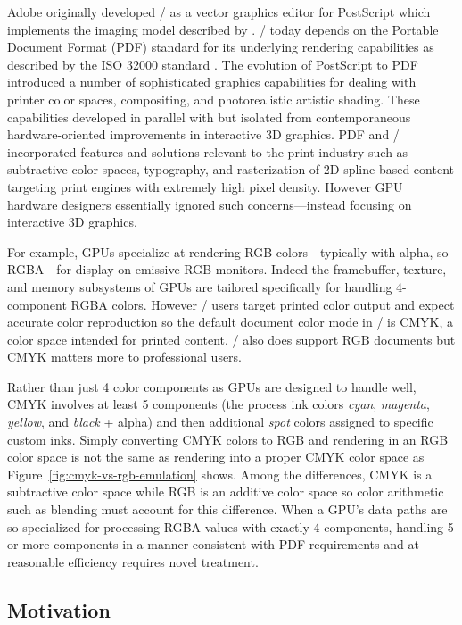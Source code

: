 Adobe
originally developed \Illustrator/ as a vector graphics editor for PostScript \cite{PLRM} which implements the
imaging model described by \cite{Warnock:1982:DIG:800064.801297}.
\Illustrator/ today depends on the Portable Document Format (PDF) standard for its underlying rendering capabilities
as described by the ISO 32000 standard \cite{PDF-Spec}.  The evolution of PostScript to PDF introduced a number
of sophisticated graphics capabilities for dealing with printer color spaces, compositing, and photorealistic artistic shading.
These capabilities developed in parallel with but isolated from
contemporaneous hardware-oriented improvements in interactive 3D graphics.
PDF and \Illustrator/ incorporated features and solutions relevant to
the print industry such as subtractive color spaces, typography, and
rasterization of 2D spline-based content targeting print engines with
extremely high pixel density.  However GPU hardware designers essentially
ignored such concerns---instead focusing on interactive 3D graphics.

For example, GPUs specialize at rendering RGB colors---typically with alpha, so RGBA---for
display on emissive RGB monitors.  Indeed the framebuffer, texture, and memory subsystems of GPUs are 
tailored specifically for handling 4-component RGBA colors.
However \Illustrator/ users target printed color output and expect accurate color reproduction
so the default document color mode in \Illustrator/ is CMYK, a color space intended for printed content.
\Illustrator/ also does support RGB documents but CMYK matters more to professional users.

Rather than just 4 color components as GPUs are designed to handle well,
CMYK involves at least 5 components (the process ink colors {\em cyan}, {\em magenta},
{\em yellow}, and {\em black} + alpha) and then additional {\em spot} colors assigned to specific custom inks.
Simply converting CMYK colors to RGB and rendering in an RGB color space is not the same as rendering into
a proper CMYK color space as Figure~\ref{fig:cmyk-vs-rgb-emulation} shows.
Among the differences, CMYK is a subtractive color space while RGB is an additive color
space so color arithmetic such as blending must account for this difference.
When a GPU's data paths are so specialized for processing RGBA values with exactly
4 components, handling 5 or more components in a manner consistent with PDF
requirements and at reasonable efficiency requires novel treatment.

\subsection{Motivation}

